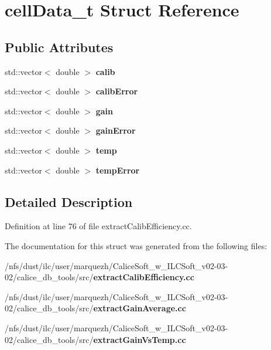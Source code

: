 \section{cell\-Data\-\_\-t Struct Reference}
\label{structcellData__t}
\subsection*{Public Attributes}
\begin{DoxyCompactItemize}
\item 
std\-::vector$<$ double $>$ {\bfseries calib}\label{structcellData__t_a2193901166f66c3fa155c8b86b0d45f7}

\item 
std\-::vector$<$ double $>$ {\bfseries calib\-Error}\label{structcellData__t_a8b8eabbdea8c8e517b1e50e3fcd46bbd}

\item 
std\-::vector$<$ double $>$ {\bfseries gain}\label{structcellData__t_a5370279efa4c75394185082989749362}

\item 
std\-::vector$<$ double $>$ {\bfseries gain\-Error}\label{structcellData__t_acd038a7f10be858777a4892d07a09e00}

\item 
std\-::vector$<$ double $>$ {\bfseries temp}\label{structcellData__t_a85463986f992a23027ce43efc65cf537}

\item 
std\-::vector$<$ double $>$ {\bfseries temp\-Error}\label{structcellData__t_ae00adcc8c3e525c420666664ec590f0e}

\end{DoxyCompactItemize}


\subsection{Detailed Description}


Definition at line 76 of file extract\-Calib\-Efficiency.\-cc.



The documentation for this struct was generated from the following files\-:\begin{DoxyCompactItemize}
\item 
/nfs/dust/ilc/user/marquezh/\-Calice\-Soft\-\_\-w\-\_\-\-I\-L\-C\-Soft\-\_\-v02-\/03-\/02/calice\-\_\-db\-\_\-tools/src/{\bf extract\-Calib\-Efficiency.\-cc}\item 
/nfs/dust/ilc/user/marquezh/\-Calice\-Soft\-\_\-w\-\_\-\-I\-L\-C\-Soft\-\_\-v02-\/03-\/02/calice\-\_\-db\-\_\-tools/src/{\bf extract\-Gain\-Average.\-cc}\item 
/nfs/dust/ilc/user/marquezh/\-Calice\-Soft\-\_\-w\-\_\-\-I\-L\-C\-Soft\-\_\-v02-\/03-\/02/calice\-\_\-db\-\_\-tools/src/{\bf extract\-Gain\-Vs\-Temp.\-cc}\end{DoxyCompactItemize}
